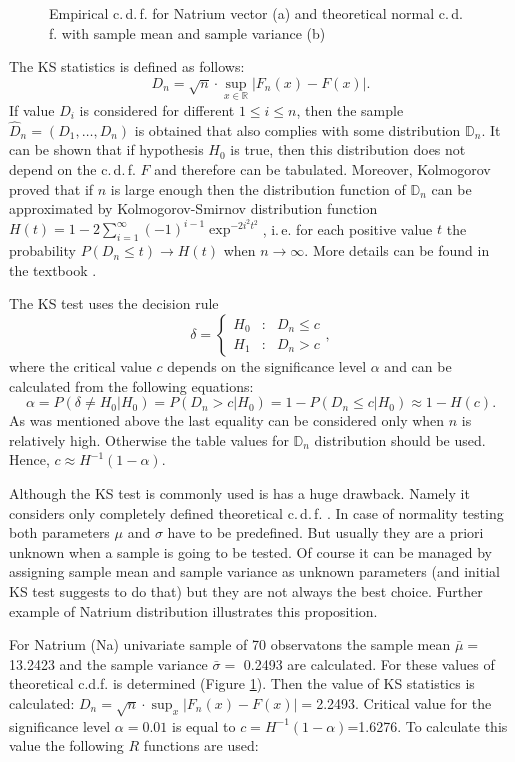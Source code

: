 \documentclass[a4paper, 12pt, titlepage, headsepline, listof = totoc, bibliography = totoc, numbers = noenddot]{scrartcl}
\newcommand{\ie}{i.\,e. }
\newcommand{\cdf}{c.\,d.\,f. }
\begin{document}
\begin{figure}[H]
\begin{subfigure}{.5\textwidth}
  \vspace{-1cm}
  \caption{}
  \label{fig:empiricTeorFunc}
\end{subfigure}
\caption{Empirical \cdf for Natrium vector (a) and theoretical normal \cdf with
sample mean and sample variance (b)}
\label{fig:commonFigureKStest}
\end{figure}

The KS statistics is defined as follows:
\[D_n = \sqrt{n}\cdot \sup_{x \in \mathbb{R}}|F_n(x)-F(x)|.\]
If value $D_i$ is considered for different $1\le i\le n$, then the sample
$\hat{D}_n=(D_1,\dots,D_n)$ is obtained that also complies with some
distribution $\mathbb{D}_n$.
It can be shown that if hypothesis $H_0$ is true, then this distribution does not depend on the \cdf $F$
and therefore can be tabulated. Moreover, Kolmogorov proved that if $n$ is large
enough then the distribution function of $\mathbb{D}_n$ can be approximated by
Kolmogorov-Smirnov distribution function
$H(t)=1-2\sum_{i=1}^{\infty}(-1)^{i-1} \exp^{-2i^2t^2}$, \ie for each positive
value $t$ the probability $P(D_n\le t)\to H(t)$ when $n \to \infty$. More
details can be found in the textbook \cite{De02}.

The KS test uses the decision rule
\[ \delta = 
\left\{
\begin{array}{rcl}
H_0&:& D_n\le c\\
H_1&:& D_n> c
\end{array}
\right.,
\]
where the critical value $c$ depends on the significance level $\alpha$ and
can be calculated from the following equations:
\[\alpha = P(\delta \ne H_0|H_0)=P(D_n>c|H_0)=1-P(D_n\le c|H_0)\approx 1-H(c).\]
As was mentioned above the last equality can be considered only when $n$ is
relatively high. Otherwise the table values for $\mathbb{D}_n$ distribution
should be used. Hence, $c\approx H^{-1}(1-\alpha)$.

Although the KS test is commonly used is has a huge drawback. Namely it
considers only completely defined theoretical \cdf. In case of normality testing
both parameters $\mu$ and $\sigma$ have to be predefined. But usually they are
a priori unknown when a sample is going to be tested. Of course it can be
managed by assigning sample mean and sample variance as unknown parameters (and
initial KS test suggests to do that) but they are not always the best choice.
Further example of Natrium distribution illustrates this proposition. 

For Natrium (Na) univariate sample of 70 observatons the sample mean
$\bar{\mu}=$13.2423 and the sample variance $\bar{\sigma}=$
0.2493 are calculated. For these values of
theoretical c.d.f. is determined (Figure \ref{fig:empiricTeorFunc}). Then
the value of KS statistics is calculated: $D_n=\sqrt{n}\cdot
\sup_x|F_n(x)-F(x)|=$2.2493.
Critical value for the significance level $\alpha=0.01$ is equal to
$c=H^{-1}(1-\alpha)$=1.6276. To
calculate this value the following $R$ functions are used:
\end{document}
